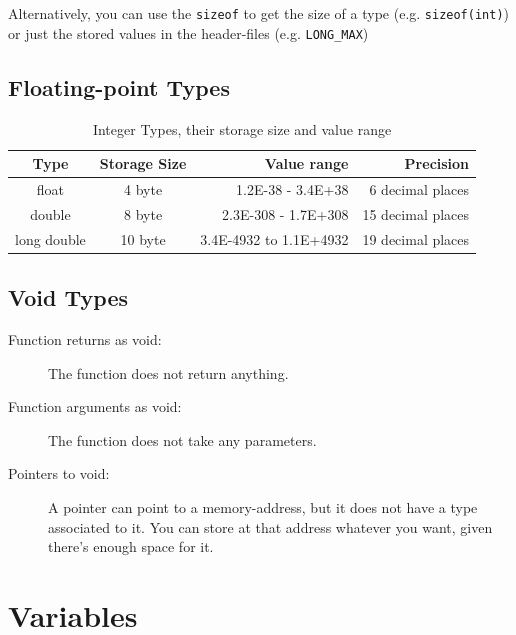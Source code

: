 \documentclass[a4paper, 11pt]{article}
\newcommand{\code}[1]{\texttt{#1}}
\renewcommand*{\thead}[1]{\bfseries #1}
\begin{document}
Alternatively, you can use the \code{sizeof} to get the size of a type (e.g. \code{sizeof(int)}) or just the stored values in the header-files (e.g. \code{LONG\_MAX})

\subsection{Floating-point Types}

\begin{table}[htpb]
    \centering
    \caption{Integer Types, their storage size and value range}
    \label{tab:int-storage}
    \begin{tabular}{|c|c|r|r|}
        \hline
        \thead{Type} & \thead{Storage Size}  & \thead{Value range} & \thead{Precision} \\
        \hline
        float & 4 byte & 1.2E-38 - 3.4E+38 & 6 decimal places \\
        \hline
        double & 8 byte & 2.3E-308 - 1.7E+308 & 15 decimal places \\
        \hline
        long double & 10 byte & 3.4E-4932 to 1.1E+4932 & 19 decimal places \\
        \hline
    \end{tabular}
\end{table}

\subsection{Void Types}

\begin{description}
    \item[Function returns as void: ] The function does not return anything.
    \item[Function arguments as void: ] The function does not take any parameters.
    \item[Pointers to void:] A pointer can point to a memory-address, but it does not have a type associated to it. You can store at that address whatever you want, given there's enough space for it.
\end{description}

\section{Variables}
\end{document}
